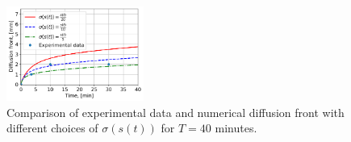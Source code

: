 \documentclass{article}
\begin{document}
\begin{figure}[h!]
	\centering
	\includegraphics[width=0.40\textwidth]{Rubber_CombinedMV_a0_500.png}
	\caption{Comparison of experimental data and numerical diffusion front with different choices of  $\sigma(s(t))$ for $T= 40$ minutes.}
\label{Fig:10}
\end{figure}



\end{document}
